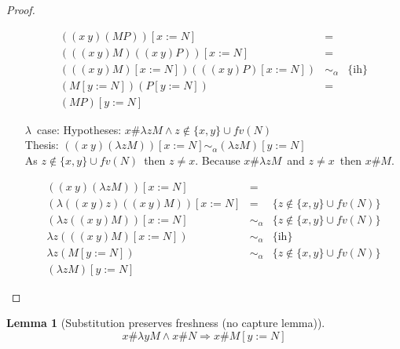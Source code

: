 \documentclass{article}
\newcommand{\alpsym}{\ensuremath{\sim_\alpha}}
\newcommand{\lam}{\ensuremath{\lambda}}
\newtheorem{lem}{Lemma}
\begin{document}
\begin{proof}
\begin{itemize}
    \[ \begin{array}{ccl}
      ((x\ y) (M P)) [x := N] &=& \\
      (((x\ y) M) ((x\ y)P)) [x := N] &=& \\
      (((x\ y) M) [x := N]) (((x\ y)P)[x := N])  &\alpsym& \{\text{ih}\}\\
      (M [y := N]) (P[y := N])  &=& \\
      (M P) [y := N]
    \end{array} \]

  \item [\lam\ case:] Hypotheses: $x \# \lam z M \wedge z \not\in \{x,y\} \cup fv(N)$ \\
                      Thesis: $((x\ y) (\lam z M )) [x := N] \alpsym (\lam z M) [ y := N]$ \\
     As $z \not\in \{x,y\} \cup fv(N)$\ then $z \not= x$. Because $x \# \lam z M$\ and $z \not=x$\ then $x \# M$.


    \[ \begin{array}{ccl}
      ((x\ y) (\lam z M)) [x := N] &=& \\
      (\lam ((x\ y) z) ((x\ y) M)) [x := N] &=& \{ z \not\in \{x,y\} \cup fv(N) \}\\
      (\lam z ((x\ y) M)) [x := N] &\alpsym& \{ z \not\in \{x,y\} \cup fv(N) \} \\
      \lam z (((x\ y) M) [x := N])  &\alpsym& \{\text{ih}\}\\
      \lam z (M [y := N])  &\alpsym& \{ z \not\in \{x,y\} \cup fv(N) \} \\
      (\lam z M)  [y := N]
    \end{array} \]
    
  \end{itemize}

\end{proof}

\begin{lem}[Substitution preserves freshness (no capture lemma)]
\label{nocapture}
\[ x \# \lam y M   \wedge x \# N \Rightarrow x \# M [ y := N] \]
\end{lem}
\end{document}
